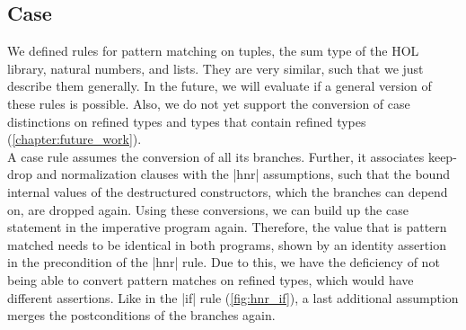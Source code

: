 \subsection{Case}\label{section:hnr_case}

We defined rules for pattern matching on tuples, the sum type of the HOL library, natural numbers, and lists. They are very similar, such that we just describe them generally. In the future, we will evaluate if a general version of these rules is possible. Also, we do not yet support the conversion of case distinctions on refined types and types that contain refined types (\autoref{chapter:future_work}).\\
A case rule assumes the conversion of all its branches. Further, it associates keep-drop and normalization clauses with the |hnr| assumptions, such that the bound internal values of the destructured constructors, which the branches can depend on, are dropped again. Using these conversions, we can build up the case statement in the imperative program again. Therefore, the value that is pattern matched needs to be identical in both programs, shown by an identity assertion in the precondition of the |hnr| rule. Due to this, we have the deficiency of not being able to convert pattern matches on refined types, which would have different assertions.
Like in the |if| rule (\autoref{fig:hnr_if}), a last additional assumption merges the postconditions of the branches again.

